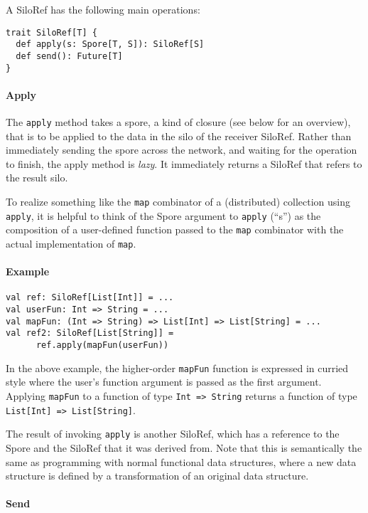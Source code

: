 \documentclass{easychair}
\begin{document}
A SiloRef has the following main operations:
\begin{verbatim}
trait SiloRef[T] {
  def apply(s: Spore[T, S]): SiloRef[S]
  def send(): Future[T]
}
\end{verbatim}

\paragraph{Apply}

The \verb|apply| method takes a spore, a kind of closure (see below for an overview), that is to be applied to
the data in the silo of the receiver SiloRef. Rather than immediately sending
the spore across the network, and waiting for the operation to finish, the
apply method is \emph{lazy}. It immediately returns a SiloRef that refers to the
result silo.

To realize something like the \verb|map| combinator of a (distributed) collection using \verb|apply|,
it is helpful to think of the Spore argument to \verb|apply| (``s'') as the composition of a
user-defined function passed to the \verb|map| combinator with the actual implementation of \verb|map|.

\paragraph{Example}

\begin{verbatim}
val ref: SiloRef[List[Int]] = ...
val userFun: Int => String = ...
val mapFun: (Int => String) => List[Int] => List[String] = ...
val ref2: SiloRef[List[String]] =
      ref.apply(mapFun(userFun))
\end{verbatim}

In the above example, the higher-order \verb|mapFun| function is expressed in curried
style where the user's function argument is passed as the first argument.
Applying \verb|mapFun| to a function of type \verb|Int => String| returns a function of type
\verb|List[Int] => List[String]|.

The result of invoking \verb|apply| is another SiloRef, which has a reference to the
Spore and the SiloRef that it was derived from. Note that this is semantically
the same as programming with normal functional data structures, where a new
data structure is defined by a transformation of an original data structure.

\paragraph{Send}
\end{document}
